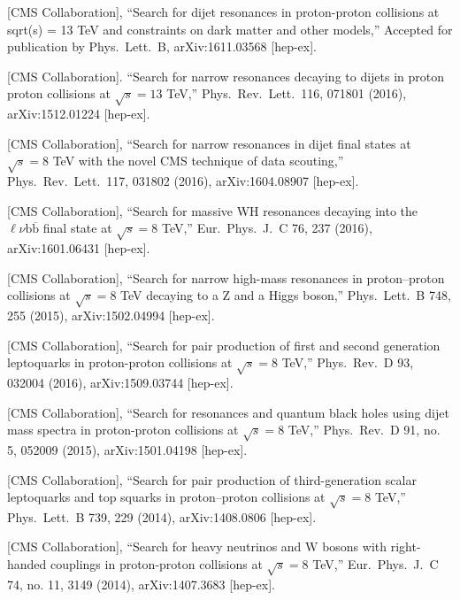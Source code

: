 \documentclass[10pt, a4paper]{article}
\begin{document}
\begin{thebibliography}{599}

  [CMS Collaboration],
  ``Search for dijet resonances in proton-proton collisions at sqrt(s) = 13 TeV and constraints on dark matter and other models,''
  Accepted for publication by Phys.\ Lett.\ B, arXiv:1611.03568 [hep-ex].

  [CMS Collaboration].
  ``Search for narrow resonances decaying to 
  dijets in proton proton
  collisions at $\sqrt{s}=13$ TeV,''
  Phys.\ Rev.\ Lett.\  116, 071801 (2016), arXiv:1512.01224 [hep-ex].

[CMS Collaboration],
  ``Search for narrow resonances in dijet final states at $\sqrt{s}=8$
  TeV with the novel CMS technique of data scouting,''
  Phys.\ Rev.\ Lett.\  117, 031802 (2016), arXiv:1604.08907 [hep-ex].

[CMS Collaboration],
  ``Search for massive WH resonances decaying into the $\ell \nu \mathrm{b} \overline{\mathrm{b}} $ final state at $\sqrt{s}=8$ TeV,''
  Eur.\ Phys.\ J.\ C 76, 237 (2016), arXiv:1601.06431 [hep-ex].

 [CMS Collaboration],
  ``Search for narrow high-mass resonances in proton–proton collisions
  at $\sqrt{s}=8$ TeV decaying to a Z and a Higgs boson,''
  Phys.\ Lett.\ B 748, 255 (2015), arXiv:1502.04994 [hep-ex].

[CMS Collaboration],
  ``Search for pair production of first and second generation
  leptoquarks in proton-proton collisions at $\sqrt{s}=8$ TeV,''
  Phys.\ Rev.\ D  93, 032004 (2016), arXiv:1509.03744 [hep-ex].

  [CMS Collaboration],
  ``Search for resonances and quantum black holes using dijet mass
  spectra in proton-proton collisions at $\sqrt{s}=8$ TeV,''
  Phys.\ Rev.\ D 91, no. 5, 052009 (2015), arXiv:1501.04198 [hep-ex].

  [CMS Collaboration],
  ``Search for pair production of third-generation scalar leptoquarks
  and top squarks in proton–proton collisions at $\sqrt{s}=8$ TeV,''
  Phys.\ Lett.\ B 739, 229 (2014), arXiv:1408.0806 [hep-ex].

  [CMS Collaboration],
  ``Search for heavy neutrinos and $\mathrm {W}$ bosons with
  right-handed couplings in proton-proton collisions at $\sqrt{s}=8$ TeV,''
  Eur.\ Phys.\ J.\ C 74, no. 11, 3149 (2014), arXiv:1407.3683 [hep-ex].


\end{thebibliography}
\end{document}
